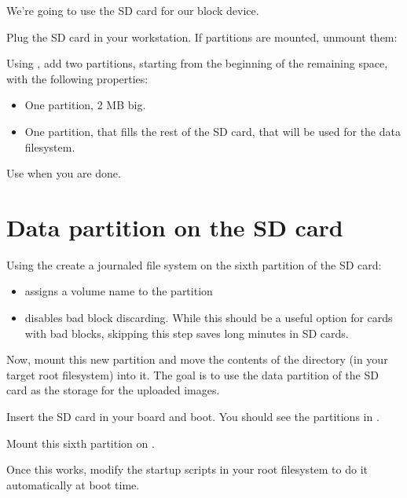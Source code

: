 We're going to use the SD card for our block device.

Plug the SD card in your workstation. If partitions are mounted,
unmount them:


Using , add two partitions, starting from the beginning
of the remaining space, with the following properties:

\begin{itemize}

\item One partition, 2 MB big.

\item One partition, that fills the rest of the SD card, that will be
  used for the data filesystem.

\end{itemize}

Use  when you are done.

\section{Data partition on the SD card}

Using the  create a journaled file system on the
sixth partition of the SD card:


\begin{itemize}
\item {} assigns a volume name to the partition
\item {} disables bad block discarding. While this
      should be a useful option for cards with bad blocks, skipping
      this step saves long minutes in SD cards.
\end{itemize}

Now, mount this new partition and move the contents of the
 directory (in your target root filesystem) into
it. The goal is to use the data partition of the SD card as the storage
for the uploaded images.

Insert the SD card in your board and boot. You should see the
partitions in .

Mount this sixth partition on .

Once this works, modify the startup scripts in your root filesystem
to do it automatically at boot time.

